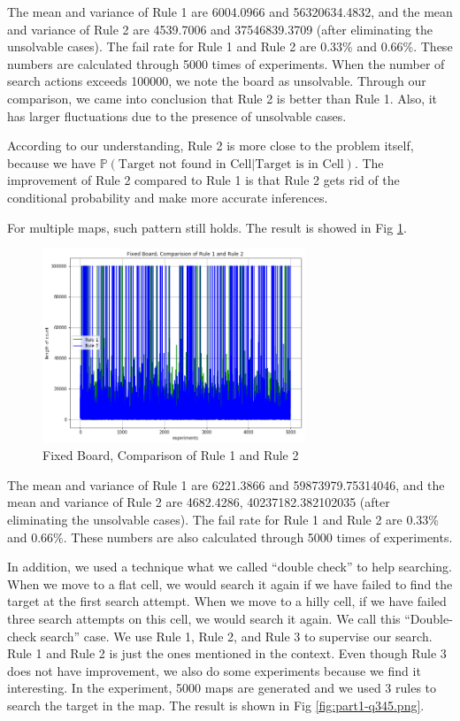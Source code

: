 \documentclass[letter]{article}
\begin{document}
\begin{enumerate}
	\par{The mean and variance of Rule 1 are 6004.0966 and 56320634.4832, and the mean and variance of Rule 2 are 4539.7006 and 37546839.3709 (after eliminating the
	unsolvable cases). The fail rate for Rule 1 and Rule 2 are 0.33\% and 0.66\%. These
	numbers are calculated through 5000 times of experiments. When the number of search
	actions exceeds 100000, we note the board as unsolvable. Through our comparison, we
	came into conclusion that Rule 2 is better than Rule 1. Also, it has larger fluctuations due
	to the presence of unsolvable cases.}
	\par{According to our understanding, Rule 2 is more close to the problem itself, because we
	have $ \mathbb{P}(\text{Target not found in Cell} | \text{Target is in Cell}) $. The improvement of Rule 2 compared to Rule 1 is that Rule 2 gets rid of the conditional probability and make more accurate inferences.}
	\par{For multiple maps, such pattern still holds. The result is showed in Fig \ref{fig:xzc2}.}
	
	\begin{figure}
		\centering
		\includegraphics[width=0.7\textwidth]{fig/xzc2.png}
		\caption{Fixed Board, Comparison of Rule 1 and Rule 2}
		\label{fig:xzc2}
	\end{figure}
	
	\par{The mean and variance of Rule 1 are 6221.3866 and 59873979.75314046,
	and the mean and variance of Rule 2 are 4682.4286, 40237182.382102035 (after eliminating the unsolvable cases). The fail rate for Rule 1 and Rule 2 are 0.33\% and 0.66\%. These numbers are also calculated through 5000 times of experiments.}
	
	In addition, we used a technique what we called ``double check'' to help searching. When we move to a flat cell, we would search it again if we have failed to find the target at the first search attempt. When we move to a hilly cell, if we have failed three search attempts on this cell, we would search it again. We call this ``Double-check search'' case. We use Rule 1, Rule 2, and Rule 3 to supervise our search. Rule 1 and Rule 2 is just the ones mentioned in the context. Even though Rule 3 does not have improvement, we also do some experiments because we find it interesting. In the experiment, 5000 maps are generated and we used 3 rules to search the target in the map. The result is shown in Fig \ref{fig:part1-q345.png}.
	

\end{enumerate}
\end{document}
